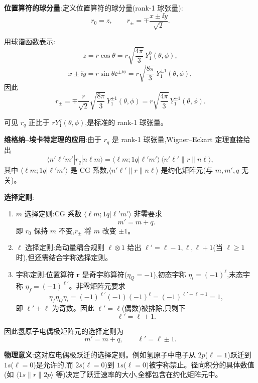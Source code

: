 \begin{solution}
	\textbf{位置算符的球分量}:定义位置算符的球分量(rank-1 球张量):
	\[
	r_0 = z,\qquad
	r_\pm = \mp\frac{x\pm\ii y}{\sqrt{2}}.
	\]

	用球谐函数表示:
	\[
	z = r\cos\theta = r\sqrt{\frac{4\pi}{3}}\,Y_1^0(\theta,\phi),
	\]
	\[
	x\pm\ii y = r\sin\theta \ee^{\pm\ii\phi} = r\sqrt{\frac{8\pi}{3}}\,Y_1^{\pm1}(\theta,\phi),
	\]
	因此
	\[
	r_\pm = \mp\frac{r}{\sqrt{2}}\sqrt{\frac{8\pi}{3}}\,Y_1^{\pm1}(\theta,\phi)
	= r\sqrt{\frac{4\pi}{3}}\,Y_1^{\pm1}(\theta,\phi).
	\]

	可见 $r_q$ 正比于 $r Y_1^q(\theta,\phi)$,是标准的 rank-1 球张量。

	\textbf{维格纳--埃卡特定理的应用}:由于 $r_q$ 是 rank-1 球张量,Wigner--Eckart 定理直接给出
	\[
	\langle n'\ell'm'|r_q|n\ell m\rangle
	= \langle \ell m;1q|\ell'm'\rangle\,
	\langle n'\ell'\|r\|n\ell\rangle,
	\]
	其中 $\langle \ell m;1q|\ell'm'\rangle$ 是 CG 系数,$\langle n'\ell'\|r\|n\ell\rangle$ 是约化矩阵元(与 $m,m',q$ 无关)。

	\textbf{选择定则}:
	\begin{enumerate}
	\item $m$ 选择定则:CG 系数 $\langle \ell m;1q|\ell'm'\rangle$ 非零要求
	\[
	m' = m + q.
	\]
	即 $r_0$ 保持 $m$ 不变,$r_\pm$ 将 $m$ 改变 $\pm1$。
	\item $\ell$ 选择定则:角动量耦合规则 $\ell\otimes1$ 给出 $\ell' = \ell-1,\ell,\ell+1$(当 $\ell\ge1$ 时),但还需结合宇称选择定则。
	\item 宇称定则:位置算符 $\mathbf r$ 是奇宇称算符($\eta_Q=-1$),初态宇称 $\eta_i=(-1)^\ell$,末态宇称 $\eta_f=(-1)^{\ell'}$。非零矩阵元要求
	\[
	\eta_f\eta_Q\eta_i = (-1)^{\ell'}(-1)(-1)^\ell = (-1)^{\ell'+\ell+1} = 1,
	\]
	即 $\ell'+\ell$ 为奇数。因此 $\ell'=\ell$(偶数)被排除,只剩下
	\[
	\ell' = \ell\pm1.
	\]
	\end{enumerate}

	因此氢原子电偶极矩阵元的选择定则为
	\[
	\boxed{m' = m+q,\qquad \ell' = \ell\pm1}.
	\]

	\textbf{物理意义}:这对应电偶极跃迁的选择定则。例如氢原子中电子从 $2p$($\ell=1$)跃迁到 $1s$($\ell=0$)是允许的,而 $2s$($\ell=0$)到 $1s$($\ell=0$)被宇称禁止。径向积分的具体数值(如 $\langle 1s\|r\|2p\rangle$ 等)决定了跃迁速率的大小,全都包含在约化矩阵元中。
	\end{solution}

